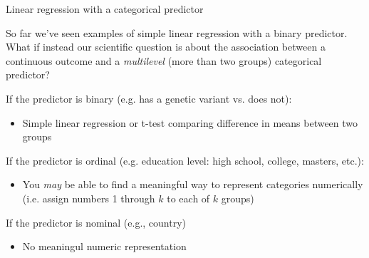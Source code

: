 \documentclass[10pt,t]{beamer}
\begin{document}
\begin{frame}{Linear regression with a categorical predictor}
	\vspace{-5 mm}
	
So far we've seen examples of simple linear regression with a binary predictor. What if instead our scientific question is about the association between a continuous outcome and a \textit{multilevel} (more than two groups) categorical predictor? \pause

\vspace{0.3cm}

If the predictor is binary (e.g. has a genetic variant vs. does not):
\begin{itemize}
	\item Simple linear regression or t-test comparing difference in means between two groups
\end{itemize} \pause

\vspace{0.3cm}

If the predictor is ordinal (e.g. education level: high school, college, masters, etc.):
\begin{itemize}
	\item You \textit{may} be able to find a meaningful way to represent categories numerically (i.e. assign numbers 1 through $k$ to each of $k$ groups)
\end{itemize} \pause

\vspace{0.3cm}

If the predictor is nominal (e.g., country)
\begin{itemize}
	\item No meaningul numeric representation
\end{itemize}

\end{frame}
\end{document}
